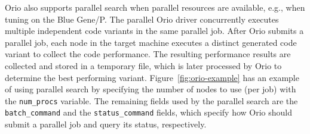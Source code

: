 Orio also supports parallel search when parallel resources are available,
e.g., when tuning on the Blue Gene/P. The parallel Orio driver concurrently
executes multiple independent code variants in the same parallel job. After
Orio submits a parallel job, each node in the target machine executes a
distinct generated code variant to collect the code performance. The
resulting performance results are collected and stored in a temporary file,
which is later processed by Orio to determine the best performing variant.
Figure~\ref{fig:orio-example} has an example of using parallel search by
specifying the number of nodes to use (per job) with the \texttt{num\_procs}
variable. The remaining fields used by the parallel search are the
\texttt{batch\_command} and the \texttt{status\_command} fields, which specify how Orio
should submit a parallel job and query its status, respectively.

